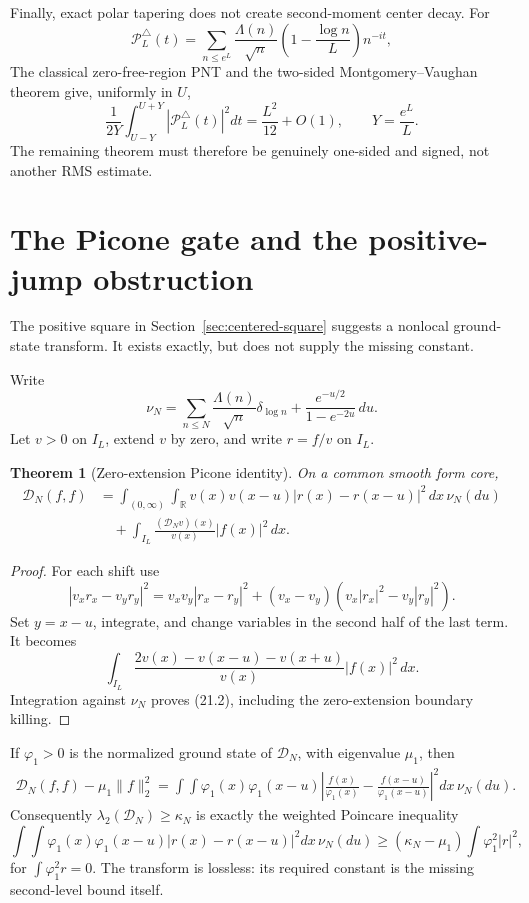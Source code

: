 \documentclass[11pt]{amsart}
\newtheorem{theorem}{Theorem}[section]
\theoremstyle{definition}
\theoremstyle{remark}
\begin{document}
Finally, exact polar tapering does not create second-moment center decay.
For
\[
 \mathcal P_L^\triangle(t)
 =
 \sum_{n\le e^L}\frac{\Lambda(n)}{\sqrt n}
 \left(1-\frac{\log n}{L}\right)n^{-it},
\]
The classical zero-free-region PNT and the two-sided
Montgomery--Vaughan theorem give, uniformly in \(U\),
\[
 \frac1{2Y}\int_{U-Y}^{U+Y}
 |\mathcal P_L^\triangle(t)|^2dt
 =
 \frac{L^2}{12}+O(1),
 \qquad Y=\frac{e^L}{L}.
\tag{20.14}
\]
The remaining theorem must therefore be genuinely one-sided and signed,
not another RMS estimate.

\section{The Picone gate and the positive-jump obstruction}
\label{sec:picone}

The positive square in Section~\ref{sec:centered-square} suggests a
nonlocal ground-state transform.  It exists exactly, but does not supply
the missing constant.

Write
\[
 \nu_N
 =
 \sum_{n\le N}\frac{\Lambda(n)}{\sqrt n}\delta_{\log n}
 +\frac{e^{-u/2}}{1-e^{-2u}}\,du.
\tag{21.1}
\]
Let \(v>0\) on \(I_L\), extend \(v\) by zero, and write \(r=f/v\) on
\(I_L\).

\begin{theorem}[Zero-extension Picone identity]
\label{thm:picone}
On a common smooth form core,
\[
\boxed{
\begin{aligned}
 \mathcal D_N(f,f)
 &=
 \int_{(0,\infty)}\!\int_{\mathbb R}
 v(x)v(x-u)|r(x)-r(x-u)|^2\,dx\,\nu_N(du)\\
 &\quad+
 \int_{I_L}\frac{(\mathcal D_Nv)(x)}{v(x)}
 |f(x)|^2\,dx.
\end{aligned}}
\tag{21.2}
\]
\end{theorem}

\begin{proof}
For each shift use
\[
 |v_xr_x-v_yr_y|^2
 =
 v_xv_y|r_x-r_y|^2
 +(v_x-v_y)(v_x|r_x|^2-v_y|r_y|^2).
\]
Set \(y=x-u\), integrate, and change variables in the second half of the
last term.  It becomes
\[
 \int_{I_L}
 \frac{2v(x)-v(x-u)-v(x+u)}{v(x)}|f(x)|^2\,dx.
\]
Integration against \(\nu_N\) proves (21.2), including the zero-extension
boundary killing.
\end{proof}

If \(\varphi_1>0\) is the normalized ground state of \(\mathcal D_N\),
with eigenvalue \(\mu_1\), then
\[
\begin{aligned}
 \mathcal D_N(f,f)-\mu_1\|f\|_2^2
 =
 \int\!\!\int
 \varphi_1(x)\varphi_1(x-u)
 \left|
 \frac{f(x)}{\varphi_1(x)}
 -\frac{f(x-u)}{\varphi_1(x-u)}
 \right|^2dx\,\nu_N(du).
\end{aligned}
\tag{21.3}
\]
Consequently \(\lambda_2(\mathcal D_N)\ge\kappa_N\) is exactly the
weighted Poincare inequality
\[
\int\!\!\int\varphi_1(x)\varphi_1(x-u)|r(x)-r(x-u)|^2
 dx\,\nu_N(du)
\ge(\kappa_N-\mu_1)\int\varphi_1^2|r|^2,
\tag{21.4}
\]
for \(\int\varphi_1^2r=0\).  The transform is lossless: its required
constant is the missing second-level bound itself.
\end{document}
